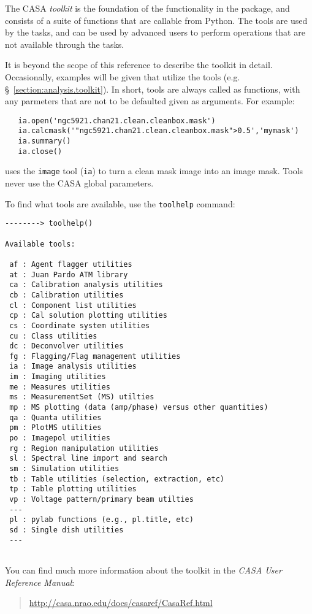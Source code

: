 The CASA {\em toolkit} is the foundation of the functionality in the 
package, and consists of a suite of functions that are callable from
Python.  The tools are used by the tasks, and can be used by advanced
users to perform operations that are not available through the tasks.

It is beyond the scope of this reference to describe the toolkit in 
detail.  Occasionally, examples will be given that utilize the tools
(e.g. \S~\ref{section:analysis.toolkit}).
In short, tools are always called as functions, with any parmeters
that are not to be defaulted given as arguments.  For example:
\small
\begin{verbatim}
   ia.open('ngc5921.chan21.clean.cleanbox.mask')
   ia.calcmask('"ngc5921.chan21.clean.cleanbox.mask">0.5','mymask')
   ia.summary()
   ia.close()
\end{verbatim}
\normalsize
uses the {\tt image} tool ({\tt ia}) to turn a clean mask image into
an image mask.  Tools never use the CASA global parameters.

To find what tools are available, use the {\tt toolhelp} command:
\small
\begin{verbatim}
--------> toolhelp()
 
Available tools: 

 af : Agent flagger utilities
 at : Juan Pardo ATM library
 ca : Calibration analysis utilities
 cb : Calibration utilities
 cl : Component list utilities
 cp : Cal solution plotting utilities
 cs : Coordinate system utilities
 cu : Class utilities
 dc : Deconvolver utilities
 fg : Flagging/Flag management utilities
 ia : Image analysis utilities
 im : Imaging utilities
 me : Measures utilities
 ms : MeasurementSet (MS) utilties
 mp : MS plotting (data (amp/phase) versus other quantities)
 qa : Quanta utilities
 pm : PlotMS utilities
 po : Imagepol utilities
 rg : Region manipulation utilities
 sl : Spectral line import and search
 sm : Simulation utilities
 tb : Table utilities (selection, extraction, etc)
 tp : Table plotting utilities
 vp : Voltage pattern/primary beam utilties
 ---
 pl : pylab functions (e.g., pl.title, etc)
 sd : Single dish utilities
 ---


\end{verbatim}
\normalsize


You can find much more information about the toolkit in the 
{\em CASA User Reference Manual}:
\begin{quote}
  \url{http://casa.nrao.edu/docs/casaref/CasaRef.html}
\end{quote}

